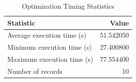 
\begin{table}[h!]
\centering
\begin{tabular}{l r}
\hline
Statistic & Value \\
\hline
Average execution time (s) & 51.542050 \\
Minimum execution time (s) & 27.400800 \\
Maximum execution time (s) & 77.554400 \\
Number of records & 10 \\
\hline
\end{tabular}
\caption{Optimization Timing Statistics}
\end{table}
